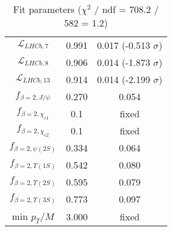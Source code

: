 \begin{table}[h!]
\begin{tabular}{c|c|c}
$\mathcal L_{LHCb,7}$ & 0.991 & 0.017 (-0.513 $\sigma$) \\
$\mathcal L_{LHCb,8}$ & 0.906 & 0.014 (-1.873 $\sigma$) \\
$\mathcal L_{LHCb,13}$ & 0.914 & 0.014 (-2.199 $\sigma$) \\
$f_{\beta=2,J/\psi}$ & 0.270 & 0.054 \\
$f_{\beta=2,\chi_{c1}}$ & 0.1 & fixed \\
$f_{\beta=2,\chi_{c2}}$ & 0.1 & fixed \\
$f_{\beta=2,\psi(2S)}$ & 0.334 & 0.064 \\
$f_{\beta=2,\Upsilon(1S)}$ & 0.542 & 0.080 \\
$f_{\beta=2,\Upsilon(2S)}$ & 0.595 & 0.079 \\
$f_{\beta=2,\Upsilon(3S)}$ & 0.773 & 0.097 \\
min $p_T/M$ & 3.000 & fixed \\
\end{tabular}
\caption{Fit parameters ($\chi^2$ / ndf = 708.2 / 582 = 1.2)}
\end{table}
